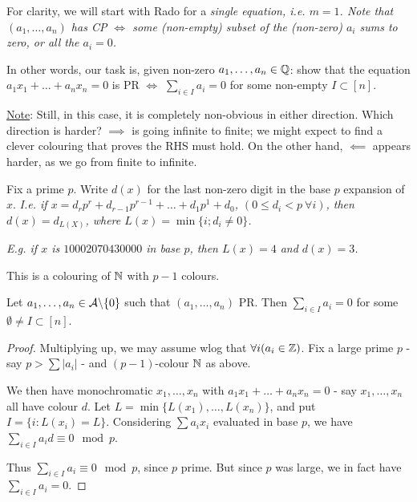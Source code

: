 \documentclass[10pt]{article}
\begin{document}
For clarity, we will start with Rado for a \it{single} equation, \it{i.e.} $m = 1$. Note that $(a_1,\dots,a_n)$ has CP $\iff$ some (non-empty) subset of the (non-zero) $a_i$ sums to zero, or all the $a_i = 0$.

In other words, our task is, given non-zero $a_1,\dots,a_n\in \mathbb{Q}$: show that the equation $a_1x_1+\dots + a_nx_n = 0$ is PR $\iff$ $\sum_{i\in I}a_i = 0$ for some non-empty $I\subset [n]$.

\underline{Note}: Still, in this case, it is completely non-obvious in either direction. Which direction is harder? $\implies$ is going infinite to finite; we might expect to find a clever colouring that proves the RHS must hold. On the other hand, $\impliedby$ appears harder, as we go from finite to infinite.

Fix a prime $p$. Write $d(x)$ for the last non-zero digit in the base $p$ expansion of $x$. \it{I.e.} if $x = d_rp^r + d_{r-1}p^{r-1}+\dots + d_1p^1+d_0$, $(0\le d_i < p\ \forall i)$, then $d(x) = d_{L(X)}$, where $L(x) = \min\{i;d_i\ne 0\}$.

\it{E.g.} if $x$ is $10002070430000$ in base $p$, then $L(x) = 4$ and $d(x) = 3$.

This is a colouring of $\mathbb{N}$ with $p-1$ colours.

\begin{prop}
    Let $a_1,\dots,a_n\in \mathcal{A}\backslash \{0\}$ such that $(a_1,\dots,a_n)$ PR. Then $\sum_{i\in I}a_i = 0$ for some $\emptyset\ne I\subset [n]$.
\end{prop}
\begin{proof}
    Multiplying up, we may assume wlog that $\forall i (a_i \in \mathbb{Z})$. Fix a large prime $p$ - say $p > \sum |a_i|$ - and $(p-1)$-colour $\mathbb{N}$ as above.

    We then have monochromatic $x_1,\dots,x_n$ with $a_1x_1+\dots + a_nx_n = 0$ - say $x_1,\dots,x_n$ all have colour $d$. Let $L = \min\{L(x_1),\dots,L(x_n)\}$, and put $I = \{i:L(x_i) = L\}$. Considering $\sum a_i x_i$ evaluated in base $p$, we have $\sum_{i\in I}a_i d \equiv 0 \mod p$.

    Thus $\sum_{i\in I}a_i \equiv 0\mod p$, since $p$ prime. But since $p$ was large, we in fact have $\sum_{i\in I}a_i = 0$.
\end{proof}
\end{document}
